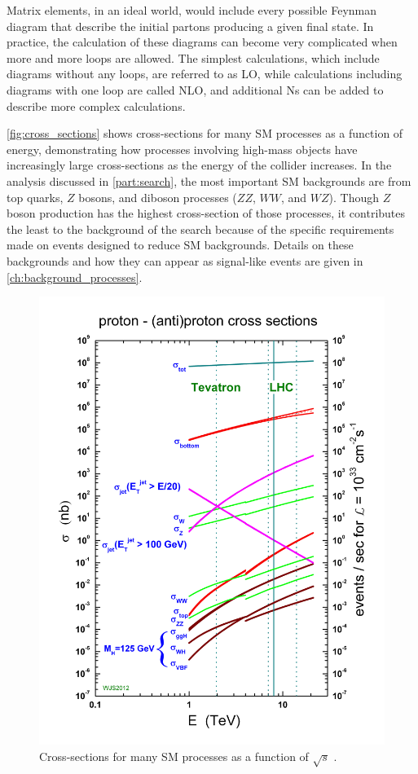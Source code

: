 Matrix elements, in an ideal world, would include every possible Feynman diagram that describe the initial partons producing a given final state. In practice, the calculation of these diagrams can become very complicated when more and more loops are allowed. The simplest calculations, which include diagrams without any loops, are referred to as \ac{LO}, while calculations including diagrams with one loop are called \ac{NLO}, and additional Ns can be added to describe more complex calculations.

\autoref{fig:cross_sections} shows cross-sections for many \ac{SM} processes as a function of energy, demonstrating how processes involving high-mass objects have increasingly large cross-sections as the energy of the collider increases. In the analysis discussed in \autoref{part:search}, the most important \ac{SM} backgrounds are from top quarks, $Z$ bosons, and diboson processes ($ZZ$, $WW$, and $WZ$). Though $Z$ boson production has the highest cross-section of those processes, it contributes the least to the background of the search because of the specific requirements made on events designed to reduce \ac{SM} backgrounds. Details on these backgrounds and how they can appear as signal-like events are given in \autoref{ch:background_processes}. 

\begin{centering}
\begin{figure}[!hbt]
\myfloatalign
\includegraphics[width=.75\linewidth]{figures/lhc/crosssections2013.jpg}
\caption{Cross-sections for many \ac{SM} processes as a function of $\sqrt{s}$ \cite{crosssections}.}
\label{fig:cross_sections}
\end{figure}
\end{centering}


